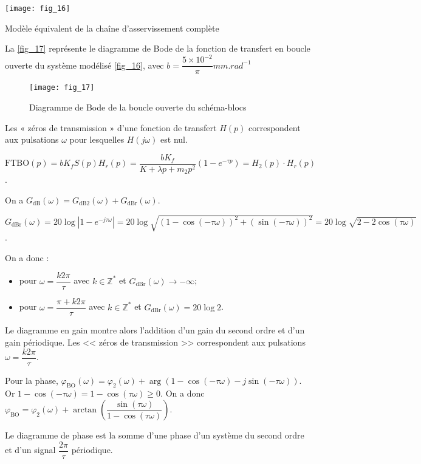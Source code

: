 \ifprof
\else
\begin{marginfigure}
\centering
\texttt{[image: fig\_16]}
\caption{Modèle équivalent de la chaîne d'asservissement complète\label{fig_16}}
\end{marginfigure}


La \autoref{fig_17} représente le diagramme de Bode de la fonction de transfert en boucle ouverte du système modélisé
\autoref{fig_16}, avec $b=\dfrac{5\times 10^{-2}}{\pi} \si{mm.rad^{-1}}$

\begin{figure}[H]
\centering
\texttt{[image: fig\_17]}
\caption{Diagramme de Bode de la boucle ouverte du schéma-blocs\label{fig_17}}
\end{figure}

Les « zéros de transmission » d’une fonction de transfert $H(p)$ correspondent aux pulsations $\omega$ pour lesquelles
$H\left(j \omega\right)$ est nul.

\fi

\ifprof
\begin{corrige}
$\text{FTBO}(p)=bK_f S(p)H_r(p)= \dfrac{bK_f}{K+\lambda p +m_2 p^2}\left(1-e^{-\tau p}\right) = H_2(p)\cdot H_r(p)$.

On a $G_{\text{dB}}(\omega)=G_{\text{dB2}}(\omega) + G_{\text{dBr}}(\omega)$.

$G_{\text{dBr}}(\omega) = 20\log \left|1-e^{-j\tau \omega} \right|=20\log 
\sqrt{\left( 1-\cos \left(-\tau \omega \right)\right)^2 + \left( \sin \left(-\tau \omega \right)\right)^2 } = 20\log \sqrt{2-2\cos \left( \tau \omega \right)}$.

On a donc :
\begin{itemize}
\item pour $\omega=\dfrac{k2\pi }{\tau}$ avec $k\in \mathbb{Z}^*$ et $G_{\text{dBr}}(\omega) \to -\infty $;
\item pour $\omega=\dfrac{\pi + k2\pi }{\tau}$ avec $k\in \mathbb{Z}^*$ et $G_{\text{dBr}}(\omega) = 20 \log 2$.
\end{itemize}

Le diagramme en gain montre alors l'addition d'un gain du second ordre et d'un gain périodique. Les << zéros de transmission >> correspondent aux pulsations $\omega=\dfrac{k2\pi }{\tau}$.

Pour la phase, $\varphi_{\text{BO}}\left( \omega\right)=\varphi_2\left( \omega\right)+\arg\left( 1-\cos\left( -\tau\omega\right) - j\sin\left(-\tau\omega\right)\right)$. Or $1-\cos\left( -\tau\omega\right) = 1-\cos\left( \tau \omega \right) \geq 0$. On a donc 
 $\varphi_{\text{BO}}=\varphi_2\left( \omega\right)+\arctan \left(\dfrac{\sin\left( \tau\omega\right)}{1-\cos\left( \tau\omega\right)} \right)$.

Le diagramme de  phase est la somme d'une phase d'un système du second ordre et d'un signal $\dfrac{2\pi}{\tau}$ périodique. 

\end{corrige}
\else
\fi

